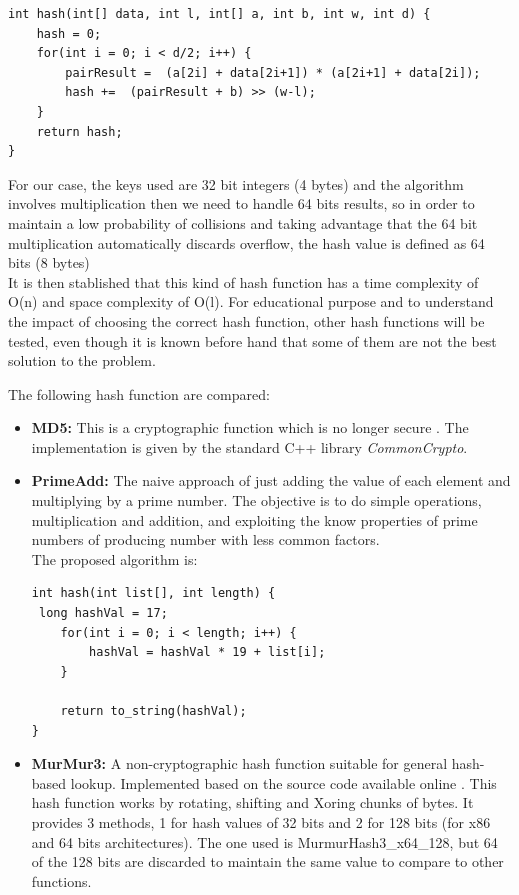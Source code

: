 \documentclass[a4paper,12pt]{article}
\begin{document}
\begin{verbatim}
int hash(int[] data, int l, int[] a, int b, int w, int d) {
    hash = 0;
    for(int i = 0; i < d/2; i++) {
        pairResult =  (a[2i] + data[2i+1]) * (a[2i+1] + data[2i]);
        hash +=  (pairResult + b) >> (w-l);
    }
    return hash;
}
\end{verbatim}

For our case, the keys used are 32 bit integers (4 bytes) and the algorithm involves multiplication then we need to handle 64 bits results, so in order to maintain a low probability of collisions and taking advantage that the 64 bit multiplication automatically discards overflow,  the hash value is defined as 64 bits (8 bytes)
\\

It is then stablished that this kind of hash function has a time complexity of O(n) and space complexity of O(l). For educational purpose and to understand the impact of choosing the correct hash function, other hash functions will be tested, even though it is known before hand that some of them are not the best solution to the problem.

The following hash function are compared:

\begin{itemize}

\item {\bf MD5:} This is a cryptographic function \cite{rivest1992md5} which is no longer secure \cite{wang2005break}.  The implementation is given by the standard C++ library {\it CommonCrypto}.

\item {\bf PrimeAdd:} The naive approach of just adding the value of each element and multiplying by a prime number. The objective is to do simple operations, multiplication and addition, and exploiting the know properties of prime numbers of producing number with less common factors. \\ 
The proposed algorithm is:

\begin{verbatim}
int hash(int list[], int length) {
 long hashVal = 17;
    for(int i = 0; i < length; i++) {
        hashVal = hashVal * 19 + list[i];
    }

    return to_string(hashVal);
}
\end{verbatim}
 

\item {\bf MurMur3:} A non-cryptographic hash function suitable for general hash-based lookup. Implemented based on the source code available online \cite{MurMur3}. This hash function works by rotating, shifting and Xoring chunks of bytes. It provides 3 methods, 1 for hash values of 32 bits and 2 for 128 bits (for x86 and 64 bits architectures). The one used is MurmurHash3\_x64\_128, but 64 of the 128 bits are discarded to maintain the same value to compare to other functions.

\end{itemize}
\end{document}

